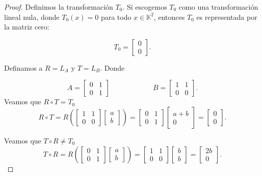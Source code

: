 \documentclass[12pt]{article}
\newcommand\K{\ensuremath{\mathbb{K}}}
\begin{document}
\begin{proof}

Definimos la transformación \(T_0\). Si escogemos \(T_0\) como una transformación lineal nula, donde \(T_0(x) = 0\) para todo \(x \in \K^2\), entonces \(T_0\) es representada por la matriz cero:

    \[
    T_0 = \begin{bmatrix}
    0  \\
    0 
    \end{bmatrix}.
    \]
    
     Definamos a $R=L_A$ y $T=L_B$. Donde
     
    \[
    A = \begin{bmatrix}
    0 & 1 \\
    0 & 1
    \end{bmatrix} \quad \quad \quad \quad \quad \quad B = \begin{bmatrix}
    1 & 1 \\
    0 & 0
    \end{bmatrix}.
    \]
    Veamos que  \(R \circ T = T_0 \) 
    \[
    R \circ T = R\left(\begin{bmatrix}
    1 & 1 \\
    0 & 0 
    \end{bmatrix} \begin{bmatrix}
    a \\
    b
    \end{bmatrix} \right) = \begin{bmatrix}
    0 & 1 \\
    0 & 1
    \end{bmatrix} \begin{bmatrix}
    a+b \\
    0
    \end{bmatrix} = \begin{bmatrix}
    0 \\
    0
    \end{bmatrix}.
    \]
    
     Veamos que \(T \circ R \neq T_0\)
    \[
    T \circ R = R\left(\begin{bmatrix}
    0 & 1 \\
    0 & 1
    \end{bmatrix} \begin{bmatrix}
    a \\
    b
    \end{bmatrix} \right) = \begin{bmatrix}
    1 & 1 \\
    0 & 0
    \end{bmatrix} \begin{bmatrix}
    b \\
    b
    \end{bmatrix} = \begin{bmatrix}
    2b \\
    0
    \end{bmatrix}.
    \]
    

\end{proof}
\end{document}
